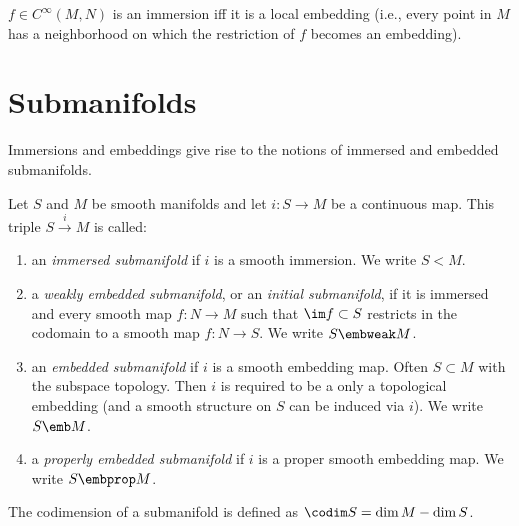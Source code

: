 \begin{thm}\label{thm.local embedding}
$f\in C^\infty (M,N)$ is an immersion iff it is a local embedding (i.e., every point in $M$ has a neighborhood on which the restriction of $f$ becomes an embedding). 
\end{thm}

\section{Submanifolds}
Immersions and embeddings give rise to the notions of immersed and embedded submanifolds.

\begin{defn}[Submanifolds]
Let $S$ and $M$ be smooth manifolds and let $i:S\to M$ be a continuous map. This triple $S\overset{i}{\to}M$ is called:
\begin{enumerate}
    \item an \emph{immersed submanifold} if $i$ is a smooth immersion. We write $S<M$.\index{$<$}
    \item  a \emph{weakly embedded submanifold}, or an \emph{initial submanifold}, if it is immersed and every smooth map $f:N\to M$ such that $\im f\subset S$ restricts in the codomain to a smooth map $f:N\to S$. We write $S\embweak M$.
    \item an \emph{embedded submanifold} if $i$ is a smooth embedding map. Often $S\subset M$ with the subspace topology. Then $i$ is required to be a only a topological embedding (and a smooth structure on $S$ can be induced via $i$). We write $S\emb M$.\index{$\emb$}
    \item a \emph{properly embedded submanifold} if $i$ is a proper smooth embedding map. We write $S\embprop M$.\index{$\embprop$}
\end{enumerate}
The codimension  of a submanifold is defined as $\codim S=\dim M -\dim S$.
\end{defn}

